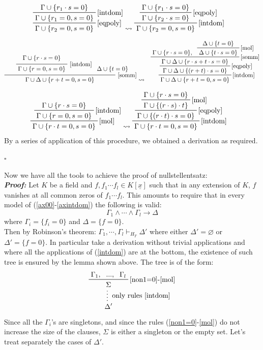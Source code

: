 \documentclass[a4paper,12pt,twoside]{book}
\newcommand*{\QED}{\hfill\ensuremath{\square}}
\let\emptyset\varnothing
\let\e\wedge
\begin{document}
\begin{eqnarray*}
\prftree[r]{\ref{eqpoly}} { \prftree[r]{\ref{intdom}} {\Gamma \cup  \{r_1\cdot s=0\}} {\Gamma \cup  \{r_1=0, s=0\}} } {\Gamma \cup \{r_2=0, s=0\}}
&  \leadsto 
\prftree[r]{\ref{intdom}} { \prftree[r]{\ref{eqpoly}} {\Gamma \cup  \{r_1\cdot s=0\}} {\Gamma \cup  \{r_2\cdot s=0\}} } {\Gamma \cup \{r_2=0, s=0\}}
\end{eqnarray*}


\begin{eqnarray*}
\prfrulenameskip=0.4em\prflinepadbefore=1ex
\prftree[r]{\ref{somm}} { \prftree[r]{\ref{intdom}} { \Gamma \cup \{ r\cdot s=0\}} { \Gamma \cup \{ r=0,s=0\} }  }{ \Delta \cup \{t=0\} }
{\hspace{11mm}\Gamma \cup \Delta \cup\{r+t=0, s=0\}\hspace{11mm}}
& \leadsto
& \prftree[r]{\ref{intdom}} 
{\prftree[r]{\ref{eqpoly}}
{ 
\prftree[r]{\ref{somm}}{\Gamma \cup \{r\cdot s=0\},} 
{ \prftree[r]{\ref{mol}} {\Delta \cup \{t=0\}  }  {\Delta \cup \{t\cdot s=0\} }}
{\Gamma \cup \Delta \cup \{r\cdot s+t\cdot s=0\} }
}
{\Gamma \cup \Delta \cup \{(r+t)\cdot s=0\} }
}
{\Gamma \cup \Delta \cup\{r+t=0, s=0\}}
\end{eqnarray*}


\begin{eqnarray*}
\prftree[r]{\ref{mol}} { \prftree[r]{\ref{intdom}} {\Gamma \cup  \{r\cdot s=0\}} {\Gamma \cup  \{r=0, s=0\}} } {\Gamma \cup \{r\cdot t=0, s=0\}}
&  \leadsto 
\prftree[r]{\ref{intdom}} 
{ \prftree[r]{\ref{eqpoly}} 
{\prftree[r]{\ref{mol}}
{\Gamma \cup \{r\cdot s=0\}}
{\Gamma\cup\{ (r\cdot s) \cdot t \}} } 
{\Gamma \cup  \{(r\cdot t) \cdot s=0\}} } 
{\Gamma \cup \{r\cdot t=0, s=0\}}
\end{eqnarray*}
By a series of application of this procedure, we obtained a derivation as required. 

\QED

Now we have all the tools to achieve the proof of nullstellentsatz:
\\\textbf{\textit{Proof: }} Let $K$ be a field and $f,f_1 \cdots f_l \in K[\underline{x}] $  such that  in any extension of $K$, $f$ vanishes at all common zeros of $f_1\cdots f_l$. 
This amounts to require that in every model of (\ref{ax00}-\ref{axintdom}) the following is valid:
$$ \Gamma_1\e\cdots\e\Gamma_l\rightarrow\Delta$$
where $\Gamma_i=\{f_i=0\}$ and $\Delta =\{f=0\}$.\\ Then by Robinson's theorem: $\Gamma_1,\cdots ,\Gamma_l \vdash_{H_T} \Delta '$ where either $\Delta '=\emptyset$ or $\Delta '=\{f=0\}$. 
In particular take a derivation without trivial applications and where all the applications of (\ref{intdom}) are at the bottom, the existence of such tree is ensured by the lemma shown above. The tree is of the form:
\begin{equation}
\prfsummary[only rules \ref{intdom}] {\prftree[r]{\ref{non1=0}-\ref{mol}}{\Gamma_1,}{...,}{\Gamma_l}{\Sigma}}{\Delta '}
\end{equation}
Since all the $\Gamma_i$'s are singletons, and since the rules (\ref{non1=0}-\ref{mol}) do not increase the size of the clauses, $\Sigma$ is either a singleton or the empty set. Let's treat separately the cases of $\Delta '$.
\end{document}
